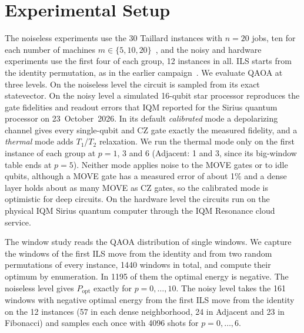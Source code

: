 \documentclass[runningheads]{llncs}
\begin{document}
\section{Experimental Setup}

The noiseless experiments use the 30 Taillard instances with $n = 20$ jobs,
ten for each number of machines $m \in \{5, 10, 20\}$~\cite{taillard1993}, and
the noisy and hardware experiments use the first four of each group, 12
instances in all. ILS starts from the identity permutation, as in the earlier
campaign~\cite{wojewodzki2026aciids}. We evaluate QAOA at three levels. On the
noiseless level the circuit is sampled from its exact statevector. On the
noisy level a simulated 16-qubit star processor reproduces the gate
fidelities and readout errors that IQM reported for the Sirius quantum processor on
23~October~2026. In its default \emph{calibrated} mode a depolarizing channel
gives every single-qubit and CZ gate exactly the measured fidelity, and a
\emph{thermal} mode adds $T_1$/$T_2$ relaxation. We run the thermal mode only on the first
instance of each group at $p = 1$, 3 and 6 (Adjacent: 1 and 3, since its
big-window table ends at $p = 5$). Neither mode applies noise to the MOVE
gates or to idle qubits, although a MOVE gate has a measured error of about
1\% and a dense layer holds about as many MOVE as CZ gates, so the
calibrated mode is optimistic for deep circuits. On the hardware level the circuits run on the physical IQM Sirius quantum
computer through the IQM Resonance cloud service.

The window study reads the QAOA distribution of single windows. We capture
the windows of the first ILS move from the identity and from two random
permutations of every instance, 1440 windows in total, and compute their
optimum by enumeration. In 1195 of them the optimal energy is negative. The
noiseless level gives $P_{\mathrm{opt}}$ exactly for $p = 0, \dots, 10$. The
noisy level takes the 161 windows with negative optimal energy from the first
ILS move from the identity on the 12 instances (57 in each dense
neighborhood, 24 in Adjacent and 23 in Fibonacci) and samples each once with
4096 shots for $p = 0, \dots, 6$.
\end{document}

